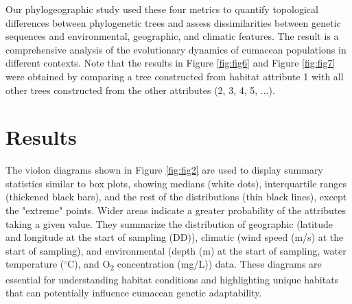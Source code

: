 Our phylogeographic study used these four metrics to quantify topological differences between phylogenetic trees and assess dissimilarities between genetic sequences and environmental, geographic, and climatic features. The result is a comprehensive analysis of the evolutionary dynamics of cumacean populations in different contexts. Note that the results in Figure \ref{fig:fig6} and Figure \ref{fig:fig7} were obtained by comparing a tree constructed from habitat attribute 1 with all other trees constructed from the other attributes (2, 3, 4, 5, ...).

\section{Results}\label{results}
The violon diagrams shown in Figure \ref{fig:fig2} are used to display summary statistics similar to box plots, showing medians (white dots), interquartile ranges (thickened black bars), and the rest of the distributions (thin black lines), except the "extreme" points. Wider areas indicate a greater probability of the attributes taking a given value. They summarize the distribution of geographic (latitude and longitude at the start of sampling (DD)), climatic (wind speed (m/s) at the start of sampling), and environmental (depth (m) at the start of sampling, water temperature ($^\circ$C), and O\textsubscript{2} concentration (mg/L)) data. These diagrams are essential for understanding habitat conditions and highlighting unique habitats that can potentially influence cumacean genetic adaptability. 

